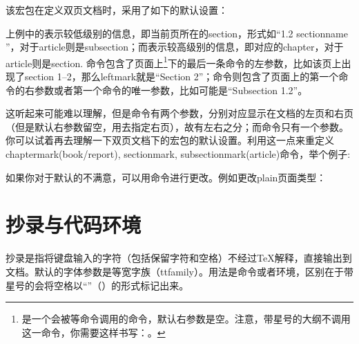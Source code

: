 该宏包在定义双页文档时，采用了如下的默认设置：
\begin{latex}
\fancyhead[LE,RO]{\slshape \rightmark}
\fancyhead[LO,RE]{\slshape \leftmark}
\fancyfoot[C]{\thepage}
\end{latex}

上例中的表示较低级别的信息，即当前页所在的section，形式如“1.2 sectionname ”，对于article则是subsection；而表示较高级别的信息，即对应的chapter，对于article则是section. 命令包含了页面上\footnote{是一个会被等命令调用的命令，默认右参数是空。注意，带星号的大纲不调用这一命令，你需要这样书写：。}下的最后一条命令的左参数，比如该页上出现了section 1--2，那么leftmark就是“Section 2”；命令则包含了页面上的第一个命令的右参数或者第一个命令的唯一参数，比如可能是“Subsection 1.2”。

这听起来可能难以理解，但是命令有两个参数，分别对应显示在文档的左页和右页（但是默认右参数留空，用去指定右页），故有左右之分；而命令只有一个参数。你可以试着再去理解一下双页文档下的宏包的默认设置。利用这一点来重定义chaptermark(book/report), sectionmark, subsectionmark(article)命令，举个例子:
\begin{latex}
\renewcommand{\sectionmark}[1]{\markright{\thesection.\ #1}}
\renewcommand{\chaptermark}[1]{\markboth{\MakeUppercase{%
    \chaptername}\ \thechapter.\ #1}{}}
\end{latex}

如果你对于默认的不满意，可以用命令进行更改。例如更改plain页面类型：
\begin{latex}
\end{latex}

\section{抄录与代码环境}
抄录是指将键盘输入的字符（包括保留字符和空格）不经过\TeX 解释，直接输出到文档。默认的字体参数是等宽字族（ttfamily）。用法是命令或者环境，区别在于带星号的会将空格以“\textvisiblespace”（）的形式标记出来。

